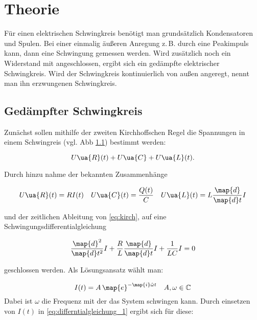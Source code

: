 \setcounter{page}{1}

\section{Theorie}

Für einen elektrischen Schwingkreis benötigt man grundsätzlich
Kondensatoren und Spulen.
Bei einer einmalig äußeren Anregung z.\,B. durch eine Peakimpuls
kann, dann eine Schwingung gemessen werden.
Wird zusätzlich noch ein Widerstand mit angeschlossen, ergibt sich ein
gedämpfte elektrischer Schwingkreis.
Wird der Schwingkreis kontinuierlich von außen angeregt, nennt man
ihn erzwungenen Schwingkreis.

\subsection{Gedämpfter Schwingkreis}

Zunächst sollen mithilfe der zweiten
Kirchhoffschen Regel die Spannungen in einem Schwingreis (vgl. Abb \ref{})
bestimmt werden:

\begin{equation}
  \label{eq:kirch}
U\ua{R}(t)+U\ua{C}+U\ua{L}(t).
\end{equation}

Durch hinzu nahme der bekannten Zusammenhänge

\begin{equation*}
U\ua{R}(t)=RI(t) \quad U\ua{C}(t)=\frac{Q(t)}{C} \quad U\ua{L}(t)=L\frac{\map{d}}{\map{d}t}I
\end{equation*}

und der zeitlichen Ableitung von \eqref{eq:kirch}, auf eine Schwingungsdifferentialgleichung

\begin{equation}
  \label{eq:differntialgleichung_1}
\frac{\map{d}^2}{\map{d}t^2}I+\frac{R}{L}\frac{\map{d}}{\map{d}t}I+\frac{1}{LC}I=0
\end{equation}

geschlossen werden.
Als Lösungsansatz wählt man:

\begin{equation*}
  I(t)=A\,\map{e}^{-\map{i}\hat{\omega} t} \quad A,\omega\in\mathbb{C}
\end{equation*}
Dabei ist $\omega$ die Frequenz mit der das System schwingen kann.
Durch einsetzen von $I(t)$ in \eqref{eq:differntialgleichung_1} ergibt sich
für diese:


